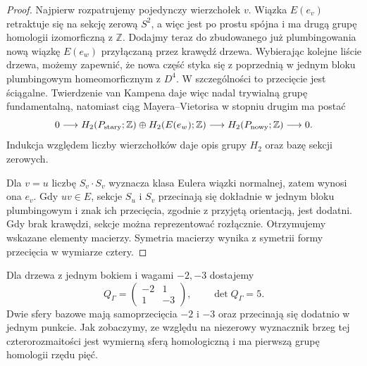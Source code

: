 \begin{proof}
Najpierw rozpatrujemy pojedynczy wierzchołek $v$.
Wiązka $E(e_v)$ retraktuje się na sekcję zerową $S^2$,
a więc jest po prostu spójna i ma drugą grupę homologii
izomorficzną z $\mathbb Z$. Dodajmy teraz do zbudowanego
już plumbingowania nową wiązkę $E(e_w)$ przyłączaną
przez krawędź drzewa. Wybierając kolejne liście drzewa,
możemy zapewnić, że nowa część styka się z poprzednią
w jednym bloku plumbingowym homeomorficznym z $D^4$.
W szczególności to przecięcie jest ściągalne.
Twierdzenie van Kampena daje więc nadal trywialną grupę
fundamentalną, natomiast ciąg Mayera--Vietorisa w stopniu
drugim ma postać
\[
0\longrightarrow H_2(P_{\rm stary};\mathbb Z)\oplus
H_2(E(e_w);\mathbb Z)\longrightarrow
H_2(P_{\rm nowy};\mathbb Z)\longrightarrow0.
\]
Indukcja względem liczby wierzchołków daje opis grupy
$H_2$ oraz bazę sekcji zerowych.

Dla $v=u$ liczbę $S_v\cdot S_v$ wyznacza klasa Eulera
wiązki normalnej, zatem wynosi ona $e_v$. Gdy $uv\in E$,
sekcje $S_u$ i $S_v$ przecinają się dokładnie w jednym
bloku plumbingowym i znak ich przecięcia, zgodnie z
przyjętą orientacją, jest dodatni. Gdy brak krawędzi,
sekcje można reprezentować rozłącznie. Otrzymujemy
wskazane elementy macierzy. Symetria macierzy wynika
z symetrii formy przecięcia w wymiarze cztery.
\end{proof}

\begin{przyklad}
Dla drzewa z jednym bokiem i wagami $-2,-3$ dostajemy
\[
Q_\Gamma=\begin{pmatrix}-2&1\\1&-3\end{pmatrix},
\qquad \det Q_\Gamma=5.
\]
Dwie sfery bazowe mają samoprzecięcia $-2$ i $-3$ oraz
przecinają się dodatnio w jednym punkcie. Jak zobaczymy,
ze względu na niezerowy wyznacznik brzeg tej czterorozmaitości
jest wymierną sferą homologiczną i ma pierwszą grupę homologii
rzędu pięć.
\end{przyklad}

\begin{center}
\end{center}

